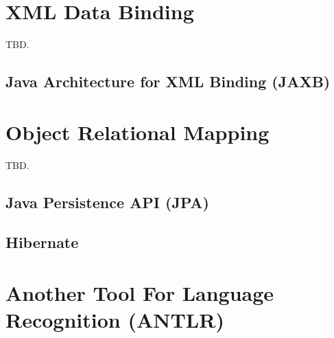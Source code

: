 \section{XML Data Binding}
TBD.


\subsection{Java Architecture for XML Binding (JAXB)}

\section{Object Relational Mapping}
TBD.



\subsection{Java Persistence API (JPA)}

\subsection{Hibernate}



\section{Another Tool For Language Recognition (ANTLR)}
\cite{Parr:2013:DAR:2501720}

